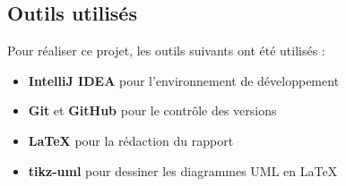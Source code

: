 \documentclass[paper=a4,fontsize=12pt,titlepage]{scrartcl}
\begin{document}
    \subsection{Outils utilisés}\label{subsec:outils-utilises}

    Pour réaliser ce projet, les outils suivants ont été utilisés :
    \begin{itemize}
        \item \textbf{IntelliJ IDEA} pour l'environnement de développement
        \item \textbf{Git} et \textbf{GitHub} pour le contrôle des versions
        \item \textbf{\LaTeX} pour la rédaction du rapport
        \item \textbf{tikz-uml} pour dessiner les diagrammes UML en \LaTeX
    \end{itemize}
\end{document}
